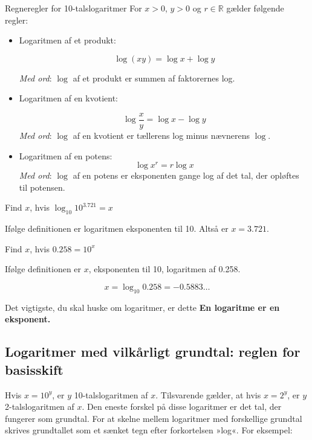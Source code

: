 \begin{custombox}{Regneregler for 10-talslogaritmer}
For $x>0$, $y>0$ og $r\in\mathbb{R}$ gælder følgende regler:
\begin{itemize}
    \item Logaritmen af et produkt:
    
    \[
    \log(xy)=\log x+\log y
    \]
    
    \textit{Med ord}: $\log$ af et produkt er summen af faktorernes log.
    \vspace{0.2cm}
    \item Logaritmen af en kvotient:
    
    \[
    \log \frac{x}{y}=\log x-\log y
    \]
    \vspace{0.1cm}
    \textit{Med ord}: $\log$ af en kvotient er tællerens log minus nævnerens $\log$.
    \vspace{0.2cm}
    \item Logaritmen af en potens:
    \[
    \log x^r=r \log x
    \]
    \textit{Med ord}: $\log$ af en potens er eksponenten gange log af det tal, der opløftes til potensen.
\end{itemize}

   
\end{custombox}

\begin{example} Find $x$, hvis $\log_{10} 10^{3.721}=x$

\begin{solution}
Ifølge definitionen er logaritmen eksponenten til 10. Altså er $x=3.721$.
\end{solution}
\end{example}

\begin{example} Find $x$, hvis $0.258=10^x$

\begin{solution}
   Ifølge definitionen er $x$, eksponenten til 10, logaritmen af 0.258.

    \[
    x=\log_{10} 0.258=-0.5883 \ldots
    \]
\end{solution}
    
\end{example}

\begin{custombox}{Det vigtigste, du skal huske om logaritmer, er dette}
    \textbf{En logaritme er en eksponent.}
\end{custombox}

\subsection*{Logaritmer med vilkårligt grundtal: reglen for basisskift}
Hvis \(x = 10^y\), er \(y\) 10-talslogaritmen af \(x\). Tilsvarende gælder, at hvis \(x = 2^y\), er \(y\) 2-talslogaritmen af \(x\). Den eneste forskel på disse logaritmer er det tal, der fungerer som grundtal. For at skelne mellem logaritmer med forskellige grundtal skrives grundtallet som et sænket tegn efter forkortelsen »log«. For eksempel:

